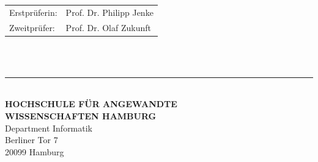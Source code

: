 \begin{titlepage}
  \hspace*{37mm}
  \begin{minipage}{0.5\linewidth}
    \begin{tabular}{@{}ll}
      Erstprüferin: & Prof. Dr. Philipp Jenke\\[-.3mm]
      Zweitprüfer: & Prof. Dr. Olaf Zukunft\\
    \end{tabular}\\

    \,\rule{9mm}{1mm}\\[1.5mm]

    \textbf{HOCHSCHULE FÜR ANGEWANDTE}\\
    \textbf{WISSENSCHAFTEN HAMBURG}\\
    Department Informatik\\
    Berliner Tor 7\\
    20099 Hamburg
  \end{minipage}
\end{titlepage}
\restoregeometry

\thispagestyle{empty}



\thispagestyle{empty}
\clearpage
